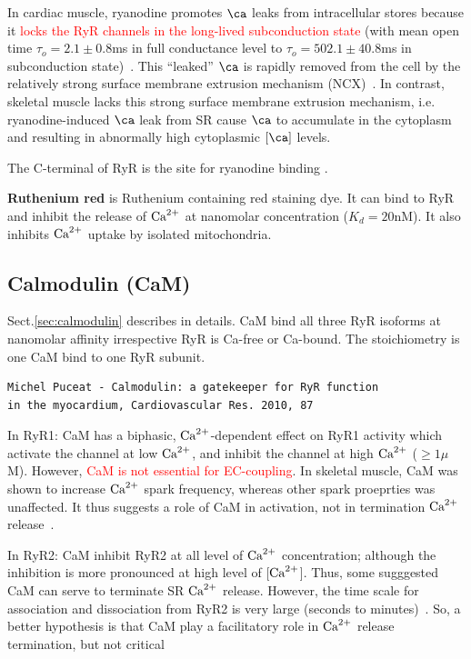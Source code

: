 In cardiac muscle, ryanodine promotes $\ca$ leaks from intracellular stores
because it \textcolor{red}{ locks the RyR channels in the long-lived
  subconduction state} (with mean open time $\tau_o = 2.1\pm 0.8$ms in full
  conductance level to $\tau_o=502.1\pm 40.8$ms in subconduction
  state)~\citep{marx2000}. This ``leaked'' $\ca$ is rapidly removed from the
  cell by the relatively strong surface membrane extrusion mechanism
  (NCX)~\citep{Bers1990}.
In contrast, skeletal muscle lacks this strong surface membrane extrusion
mechanism, i.e. ryanodine-induced $\ca$ leak from SR cause $\ca$ to accumulate
in the cytoplasm and resulting in abnormally high cytoplasmic $[\ca]$ levels.

The C-terminal of RyR is the site for ryanodine binding \citep{callaway1994,
witcher1994}. 


{\bf Ruthenium red} is Ruthenium containing red staining dye. It can
bind to RyR and inhibit the release of ${\text{Ca}^{2+}}$ at nanomolar
concentration ($K_d=20$nM). It also inhibits ${\text{Ca}^{2+}}$ uptake by isolated
mitochondria.

\subsection{Calmodulin (CaM)}
\label{sec:RyR_CaM}
\label{sec:RyR-Ca2+-calmodulin}

Sect.\ref{sec:calmodulin} describes in details. CaM bind all three RyR isoforms
at nanomolar affinity irrespective RyR is Ca-free or Ca-bound. The stoichiometry
is one CaM bind to one RyR subunit.

\begin{verbatim}
Michel Puceat - Calmodulin: a gatekeeper for RyR function 
in the myocardium, Cardiovascular Res. 2010, 87
\end{verbatim}

In RyR1: CaM has a biphasic, ${\text{Ca}^{2+}}$-dependent effect on RyR1 activity which
activate the channel at low ${\text{Ca}^{2+}}$, and inhibit the channel at high ${\text{Ca}^{2+}}$ ($\ge 1\mu$M).
However, \textcolor{red}{CaM is not essential for EC-coupling}. In skeletal
muscle, CaM was shown to increase ${\text{Ca}^{2+}}$ spark frequency, whereas other spark
proeprties was unaffected. It thus suggests a role of CaM in activation, not in
termination ${\text{Ca}^{2+}}$ release~\citep{Rodney2003}. 

In RyR2: CaM inhibit RyR2 at all level of ${\text{Ca}^{2+}}$ concentration; although the
inhibition is more pronounced at high level of [${\text{Ca}^{2+}}$]. Thus, some sugggested
CaM can serve to terminate SR ${\text{Ca}^{2+}}$ release. However, the time scale for
association and dissociation from RyR2 is very large (seconds to
minutes)~\citep{Balshaw2001}. So, a better hypothesis is that CaM play a
facilitatory role in ${\text{Ca}^{2+}}$ release termination, but not critical~\citep{Xu2004}


